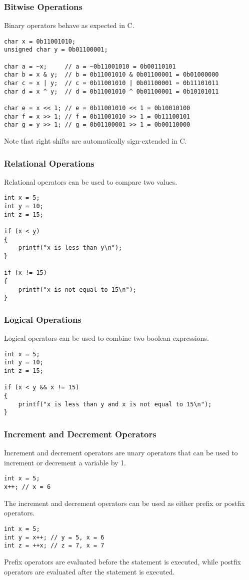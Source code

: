 \documentclass{article}
\begin{document}
\subsubsection{Bitwise Operations}
Binary operators behave as expected in C.
\begin{verbatim}
char x = 0b11001010;
unsigned char y = 0b01100001;

char a = ~x;     // a = ~0b11001010 = 0b00110101
char b = x & y;  // b = 0b11001010 & 0b01100001 = 0b01000000
char c = x | y;  // c = 0b11001010 | 0b01100001 = 0b11101011
char d = x ^ y;  // d = 0b11001010 ^ 0b01100001 = 0b10101011

char e = x << 1; // e = 0b11001010 << 1 = 0b10010100
char f = x >> 1; // f = 0b11001010 >> 1 = 0b11100101
char g = y >> 1; // g = 0b01100001 >> 1 = 0b00110000
\end{verbatim}
Note that right shifts are automatically sign-extended in C.
\subsubsection{Relational Operations}
Relational operators can be used to compare two values.
\begin{verbatim}
int x = 5;
int y = 10;
int z = 15;

if (x < y)
{
    printf("x is less than y\n");
}

if (x != 15)
{
    printf("x is not equal to 15\n");
}
\end{verbatim}
\subsubsection{Logical Operations}
Logical operators can be used to combine two boolean expressions.
\begin{verbatim}
int x = 5;
int y = 10;
int z = 15;

if (x < y && x != 15)
{
    printf("x is less than y and x is not equal to 15\n");
}
\end{verbatim}
\subsubsection{Increment and Decrement Operators}
Increment and decrement operators are unary operators that can be used
to increment or decrement a variable by 1.
\begin{verbatim}
int x = 5;
x++; // x = 6
\end{verbatim}
The increment and decrement operators can be used as either prefix or
postfix operators.
\begin{verbatim}
int x = 5;
int y = x++; // y = 5, x = 6
int z = ++x; // z = 7, x = 7
\end{verbatim}
Prefix operators are evaluated before the statement is executed, while
postfix operators are evaluated after the statement is executed.
\end{document}
